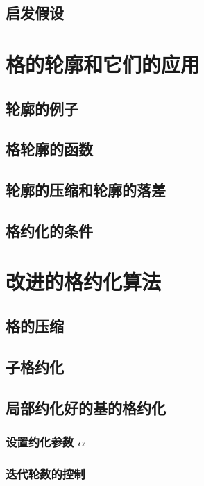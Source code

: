 \documentclass[UTF8]{ctexart}
\begin{document}
    \subsection{启发假设}

\section{格的轮廓和它们的应用}

    \subsection{轮廓的例子}

    \subsection{格轮廓的函数}

    \subsection{轮廓的压缩和轮廓的落差}

    \subsection{格约化的条件}


\section{改进的格约化算法}

    \subsection{格的压缩}

    \subsection{子格约化}

    \subsection{局部约化好的基的格约化}

        \subsubsection{设置约化参数 $ \alpha $}

        \subsubsection{迭代轮数的控制}
\end{document}
